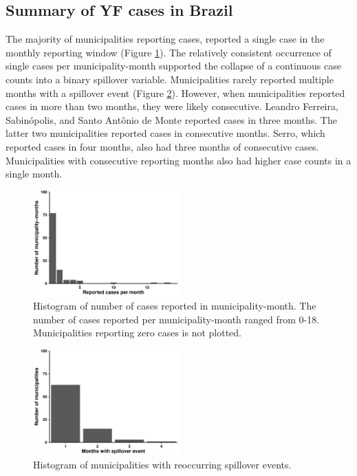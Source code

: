 \documentclass{article}
\begin{document}
\subsection{Summary of YF cases in Brazil}

The majority of municipalities reporting cases, reported a single case in the monthly reporting window (Figure \ref{fig:caseCounts}). The relatively consistent occurrence of single cases per municipality-month supported the collapse of a continuous case counts into a binary spillover variable. Municipalities rarely reported multiple months with a spillover event (Figure \ref{fig:multipleSpills}). However, when municipalities reported cases in more than two months, they were likely consecutive.  Leandro Ferreira, Sabin\'{o}polis, and Santo Ant\^{o}nio de Monte reported cases in three months. The latter two municipalities reported cases in consecutive months. Serro, which reported cases in four months, also had three months of consecutive cases. Municipalities with consecutive reporting months also had higher case counts in a single month.  

\begin{figure} [h]
\centering
\includegraphics[width=0.5\textwidth]{Hist_Reported_Cases}
\caption{Histogram of number of cases reported in municipality-month. The number of cases reported per municipality-month ranged from 0-18. Municipalities reporting zero cases is not plotted. }
\label{fig:caseCounts}
\end{figure}


\begin{figure} [h]
\centering
\includegraphics[width=0.5\textwidth]{Hist_Repeated_Spillover}
\caption{Histogram of municipalities with reoccurring spillover events.}
\label{fig:multipleSpills}
\end{figure}
\end{document}
